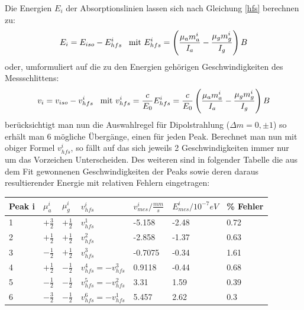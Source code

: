 \documentclass[12pt]{article}
\begin{document}
Die Energien $E_i$ der Absorptionslinien lassen sich nach Gleichung \ref{hfs} berechnen zu:
\begin{align*}
 E_i = E_{iso} - E_{hfs}^i \hspace{5pt} \textnormal{    mit } E_{hfs}^i = \left( \frac{\mu_a m_a^i}{I_a} - \frac{\mu_g m_g^i}{I_g} \right) B
\end{align*}
oder, umformuliert auf die zu den Energien gehörigen Geschwindigkeiten des Messschlittens:
\begin{align*}
 v_i = v_{iso} - v_{hfs}^i \hspace{5pt} \textnormal{    mit } v_{hfs}^i = \frac{c}{E_0} E_{hfs}^i = \frac{c}{E_0} \left( \frac{\mu_a m_a^i}{I_a} - \frac{\mu_g m_g^i}{I_g} \right) B
\end{align*}
\label{geschw}
berücksichtigt man nun die Auswahlregel für Dipolstrahlung ($\Delta m = 0, \pm 1$) so erhält man 6 mögliche Übergänge, einen für jeden Peak. Berechnet man 
nun mit obiger Formel $v_{hfs}^i$, so fällt auf das sich jeweils 2 Geschwindigkeiten immer nur um das Vorzeichen Unterscheiden.
Des weiteren sind in folgender Tabelle die aus dem Fit gewonnenen Geschwindigkeiten der Peaks sowie deren daraus resultierender Energie mit relativen Fehlern
eingetragen:
\begin{center}
\begin{tabular}{|l|l|l|l|l|l|l|}
\hline
Peak i & $\mu_a^i$ & $\mu_g^i$ & $v_{hfs}^i$ & $v_{mes}^i/\frac{mm}{s}$ & $E_{mes}^i/10^{-7} eV$ & \% Fehler\\
\hline
1 & $+\frac{3}{2}$ & $+\frac{1}{2}$ & $v_{hfs}^1$ & -5.158 & -2.48 & 0.72\\
2 & $+\frac{1}{2}$ & $+\frac{1}{2}$ & $v_{hfs}^2$ & -2.858 & -1.37 & 0.63\\
3 & $-\frac{1}{2}$ & $+\frac{1}{2}$ & $v_{hfs}^3$ & -0.7075 & -0.34 & 1.61\\
4 & $+\frac{1}{2}$ & $-\frac{1}{2}$ & $v_{hfs}^4 = -v_{hfs}^3$ & 0.9118 & -0.44 & 0.68\\
5 & $-\frac{1}{2}$ & $-\frac{1}{2}$ & $v_{hfs}^5 = -v_{hfs}^2$ & 3.31 & 1.59 & 0.39\\
6 & $-\frac{3}{2}$ & $-\frac{1}{2}$ & $v_{hfs}^6 = -v_{hfs}^1$ & 5.457 & 2.62 & 0.3\\
\hline
\end{tabular}
\label{eisen_tab1}
\end{center}
\end{document}

